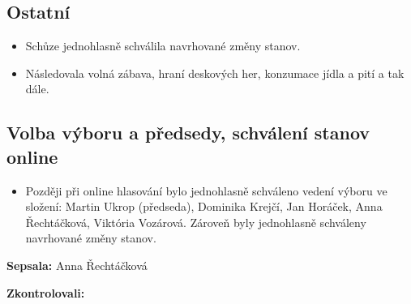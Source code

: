 \documentclass[11pt,a4paper]{article}
\begin{document}
\subsection*{Ostatní}
\begin{itemize}[itemsep=0pt]
\item Schůze jednohlasně schválila navrhované změny stanov.
\item Následovala volná zábava, hraní deskových her, konzumace jídla a pití a tak dále.
\end{itemize}

\subsection*{Volba výboru a předsedy, schválení stanov online}
\begin{itemize}[itemsep=0pt]
\item Později při online hlasování bylo jednohlasně schváleno vedení výboru ve složení: Martin Ukrop (předseda), Dominika Krejčí, Jan Horáček, Anna Řechtáčková, Viktória Vozárová. Zároveň byly jednohlasně schváleny navrhované změny stanov.
\end{itemize}

\textbf{Sepsala:} Anna Řechtáčková

\textbf{Zkontrolovali:} 
\end{document}

